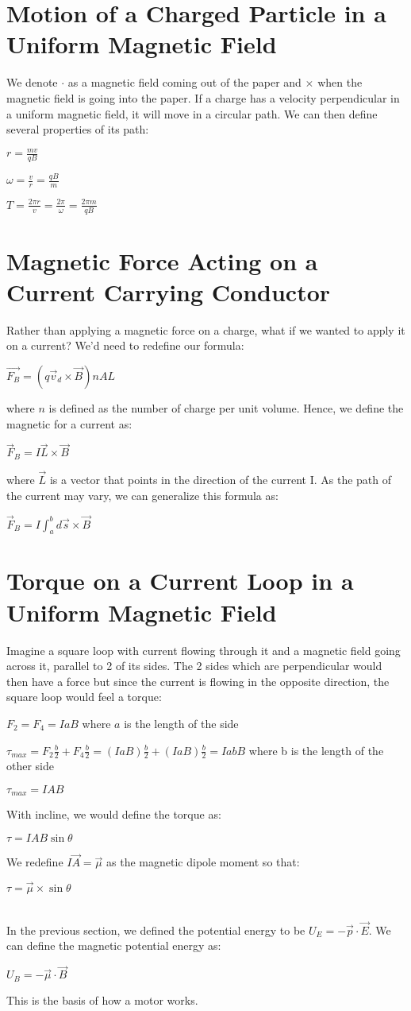 \documentclass[12pt]{report}
\begin{document}
	\section{Motion of a Charged Particle in a Uniform Magnetic Field}
		We denote $\cdot$ as a magnetic field coming out of the paper and $\times$ when the magnetic field is going into the paper. If a charge has a velocity perpendicular in a uniform magnetic field, it will move in a circular path. We can then define several properties of its path:\\
		\centerline{$ r = \frac{mv}{qB}$}
		\centerline{$ \omega = \frac{v}{r} = \frac{qB}{m}$}
		\centerline{$ T = \frac{2\pi r}{v} = \frac{2\pi}{\omega} = \frac{2\pi m}{qB}$}
	\section{Magnetic Force Acting on a Current Carrying Conductor}
		Rather than applying a magnetic force on a charge, what if we wanted to apply it on a current? We'd need to redefine our formula:\\
		\centerline{$\vec{F_B} = (q\vec{v}_d \times \vec{B})nAL$}
		where $n$ is defined as the number of charge per unit volume. Hence, we define the magnetic for a current as:\\
		\centerline{$\vec{F}_B = I\vec{L} \times \vec{B}$}
		where $\vec{L}$ is a vector that points in the direction of the current I. As the path of the current may vary, we can generalize this formula as:\\
		\centerline{$\vec{F}_B = I\int_{a}^{b} d\vec{s} \times \vec{B}$}
	\section{Torque on a Current Loop in a Uniform Magnetic Field}
		Imagine a square loop with current flowing through it and a magnetic field going across it, parallel to 2 of its sides. The 2 sides which are perpendicular would then have a force but since the current is flowing in the opposite direction, the square loop would feel a torque:\\
		\centerline{$F_2 = F_4 = IaB$ where $a$ is the length of the side}
		\centerline{$\tau_{max} = F_2 \frac{b}{2} + F_4 \frac{b}{2} = (IaB) \frac{b}{2} + (IaB)\frac{b}{2} = IabB$ where b is the length of the other side}
		\centerline{$\tau_{max} = IAB$}
		With incline, we would define the torque as:\\
		\centerline{$\tau = IAB\sin \theta$}
		We redefine $I\vec{A} = \vec{\mu}$ as the magnetic dipole moment so that:\\
		\centerline{$\tau = \vec{\mu} \times \sin \theta$}
		\\
		In the previous section, we defined the potential energy to be $U_E = -\vec{p} \cdot \vec{E}$. We can define the magnetic potential energy as:\\
		\centerline{$U_B = -\vec{\mu} \cdot \vec{B}$}
		This is the basis of how a motor works.
\end{document}
